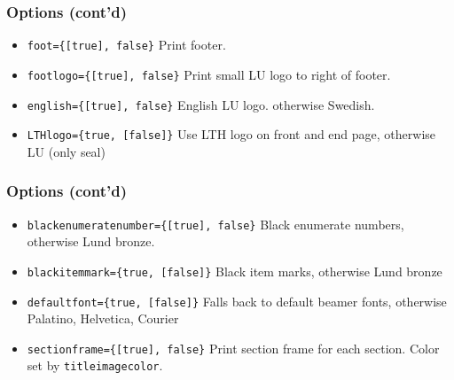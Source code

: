 \documentclass[aspectratio=1610]{beamer}
\begin{document}
\begin{frame}[fragile]
  \frametitle{Options (cont'd)}
  \begin{itemize}
  \item \verb|foot={[true], false}|\newline
    Print footer.
  \item \verb|footlogo={[true], false}|\newline
    Print small LU logo to right of footer.
  \item \verb|english={[true], false}|\newline
    English LU logo. otherwise Swedish.
  \item \verb|LTHlogo={true, [false]}|\newline
    Use LTH logo on front and end page, otherwise LU (only seal)
  \end{itemize}
\end{frame}

\begin{frame}[fragile]
  \frametitle{Options (cont'd)}
  \begin{itemize}
  \item \verb|blackenumeratenumber={[true], false}|\newline
    Black enumerate numbers, otherwise Lund bronze.
  \item \verb|blackitemmark={true, [false]}|\newline
    Black item marks, otherwise Lund bronze
  \item \verb|defaultfont={true, [false]}|\newline
    Falls back to default beamer fonts, otherwise Palatino, Helvetica, Courier
  \item \verb|sectionframe={[true], false}|\newline
    Print section frame for each section. Color set by \verb|titleimagecolor|.
  \end{itemize}
\end{frame}
\end{document}
